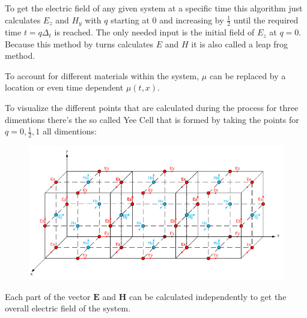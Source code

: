 To get the electric field of any given system at a specific time this algorithm just calculates $E_z$ and $H_y$ with $q$ starting at 0 and increasing by $\frac{1}{2}$ until the required time $t = q\Delta_t$ is reached. The only needed input is the initial field of $E_z$ at $q = 0$. Because this method by turns calculates $E$ and $H$ it is also called a leap frog method.

To account for different materials within the system, $\mu$ can be replaced by a location or even time dependent $\mu(t, x)$.

To visualize the different points that are calculated during the process for three dimentions there's the so called Yee Cell that is formed by taking the points for $q=0,\frac{1}{2},1$ all dimentions:

\begin{figure}[!h]
  \centering
  \includegraphics[width=\textwidth]{./images/yeecell.jpg}
  \caption{\mcite}
\end{figure}

Each part of the vector $\mathbf{E}$ and $\mathbf{H}$ can be calculated independently to get the overall electric field of the system.

